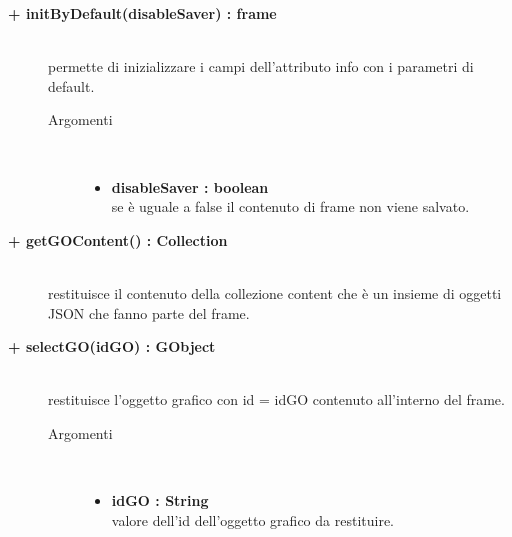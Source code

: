 \begin{description}
\begin{description}
		\item[\textbf{\color{blue}+ initByDefault(disableSaver) : frame			}] \hfill \\
			permette di inizializzare i campi dell'attributo info con i parametri di default. 

\begin{description}
			\item[Argomenti] \hfill \\
				\begin{itemize}
						\item \textbf{disableSaver : boolean			} \hfill \\
					se è uguale a false il contenuto di frame non viene salvato. %
				\end{itemize}

\end{description}

\end{description}

\begin{description}
		\item[\textbf{\color{blue}+ getGOContent() : Collection			}] \hfill \\
			restituisce il contenuto della collezione content che è un insieme di oggetti JSON che fanno parte del frame.
\end{description}

\begin{description}
		\item[\textbf{\color{blue}+ selectGO(idGO) : GObject			}] \hfill \\
			restituisce l'oggetto grafico con id = idGO contenuto all'interno del frame. 

\begin{description}
			\item[Argomenti] \hfill \\
				\begin{itemize}
						\item \textbf{idGO : String			} \hfill \\
					valore dell'id dell'oggetto grafico da restituire.  				
				\end{itemize}

\end{description}

\end{description}


\end{description}
